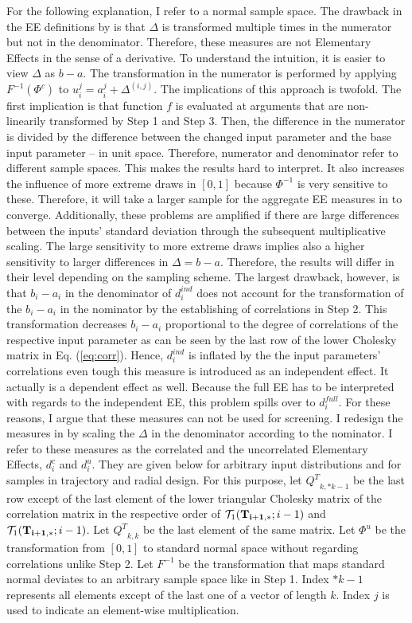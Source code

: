 For the following explanation, I refer to a normal sample space. The drawback in the EE definitions by \cite{ge2017extending} is that $\Delta$ is transformed multiple times in the numerator but not in the denominator. Therefore, these measures are not Elementary Effects in the sense of a derivative. To understand the intuition, it is easier to view $\Delta$ as $b-a$. The transformation in the numerator is performed by applying $F^{-1}(\Phi^c)$ to $u_i^j = a_i^j + \Delta^{(i,j)}$. The implications of this approach is twofold. The first implication is that function $f$ is evaluated at arguments that are non-linearily transformed by Step 1 and Step 3. Then, the difference in the numerator is divided by the  difference between the changed input parameter and the base input parameter -- in unit space. Therefore, numerator and denominator refer to different sample spaces. This makes the results hard to interpret. It also increases the influence of more extreme draws in $[0,1]$ because $\Phi^{-1}$ is very sensitive to these. Therefore, it will take a larger sample for the aggregate EE measures in \cite{ge2017extending} to converge. Additionally, these problems are amplified if there are large differences between the inputs' standard deviation through the subsequent multiplicative scaling. The large sensitivity to more extreme draws implies also a higher sensitivity to larger differences in $\Delta=b-a$. Therefore, the results will differ in their level depending on the sampling scheme. The largest drawback, however, is that $b_i-a_i$ in the denominator of $d_i^{ind}$ does not account for the transformation of the $b_i-a_i$ in the nominator by the establishing of correlations in Step 2. This transformation decreases $b_i-a_i$ proportional to the degree of correlations of the respective input parameter as can be seen by the last row of the lower Cholesky matrix in Eq. (\ref{eq:corr}). Hence, $d_i^{ind}$ is inflated by the the input parameters' correlations even tough this measure is introduced as an independent effect. It actually is a dependent effect as well. Because the full EE has to be interpreted with regards to the independent EE, this problem spills over to $d_i^{full}$. For these reasons, I argue that these measures can not be used for screening. I redesign the measures in \cite{ge2017extending} by scaling the $\Delta$ in the denominator according to the nominator. I refer to these measures as the correlated and the uncorrelated Elementary Effects, $d_i^{c}$ and $d_i^{u}$. They are given below for arbitrary input distributions and for samples in trajectory and radial design. For this purpose, let ${Q^T}_{k,*k-1}$ be the last row except of the last element of the lower triangular Cholesky matrix of the correlation matrix in the respective order of $\mathcal{T}_1(\bold{T_{i+1,*}}; i-1)$ and $\mathcal{T}_1(\bold{T_{i+1,*}}; i-1)$. Let ${Q^T}_{k,k}$ be the last element of the same matrix. Let $\Phi^u$ be the transformation from $[0,1]$ to standard normal space without regarding correlations unlike Step 2. Let $F^{-1}$ be the transformation that maps standard normal deviates to an arbitrary sample space like in Step 1. Index $*k-1$ represents all elements except of the last one of a vector of length $k$. Index $j$ is used to indicate an element-wise multiplication.

